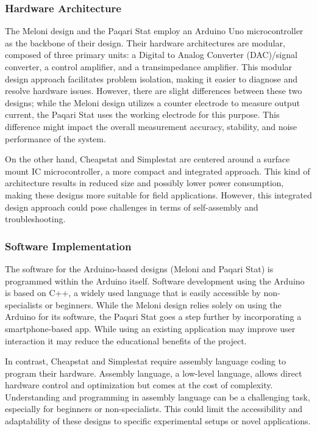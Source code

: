 \documentclass{article}
\begin{document}
\subsubsection*{Hardware Architecture}
The Meloni design and the Paqari Stat employ an Arduino Uno microcontroller as the backbone of their design. Their hardware architectures are modular, composed of three primary units: a Digital to Analog Converter (DAC)/signal converter, a control amplifier, and a transimpedance amplifier. This modular design approach facilitates problem isolation, making it easier to diagnose and resolve hardware issues. However, there are slight differences between these two designs; while the Meloni design utilizes a counter electrode to measure output current, the Paqari Stat uses the working electrode for this purpose. This difference might impact the overall measurement accuracy, stability, and noise performance of the system.


On the other hand, Cheapstat and Simplestat are centered around a surface mount IC microcontroller, a more compact and integrated approach. This kind of architecture results in reduced size and possibly lower power consumption, making these designs more suitable for field applications. However, this integrated design approach could pose challenges in terms of self-assembly and troubleshooting.


\subsubsection*{Software Implementation}
The software for the Arduino-based designs (Meloni and Paqari Stat) is programmed within the Arduino itself. Software development using the Arduino is based on C++, a widely used language that is easily accessible by non-specialists or beginners. While the Meloni design relies solely on using the Arduino for its software, the Paqari Stat goes a step further by incorporating a smartphone-based app. While using an existing application may improve user interaction it may reduce the educational benefits of the project.


In contrast, Cheapstat and Simplestat require assembly language coding to program their hardware. Assembly language, a low-level language, allows direct hardware control and optimization but comes at the cost of complexity. Understanding and programming in assembly language can be a challenging task, especially for beginners or non-specialists. This could limit the accessibility and adaptability of these designs to specific experimental setups or novel applications.
\end{document}
